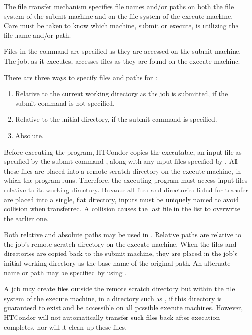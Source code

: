 

The file transfer mechanism specifies file names and/or paths on
both the file system of the submit machine and on the
file system of the execute machine.
Care must be taken to know which machine, submit or execute,
is utilizing the file name and/or path. 

Files in the  command
are specified as they are accessed on the submit machine.
The job, as it executes, accesses files as they are
found on the execute machine.

There are three ways to specify files and paths
for :
\begin{enumerate}
\item Relative to the current working directory as the job is submitted,
if the submit command  is not specified.
\item Relative to the initial directory, if the submit command 
 is specified.
\item Absolute.
\end{enumerate}

Before executing the program, HTCondor copies the
executable, an input file as specified
by the submit command ,
along with any input files specified 
by .
All these files are placed into
a remote scratch directory on the execute machine,
in which the program runs.
Therefore,
the executing program must access input files relative to its
working directory.
Because all files and directories listed for transfer are placed into a single,
flat directory,
inputs must be uniquely named to
avoid collision when transferred.
A collision causes the last file in the list to
overwrite the earlier one.

Both relative and absolute paths may be used in
.  Relative paths are relative to
the job's remote scratch directory on the execute machine.
When the files and directories are copied back to the submit machine, they
are placed in the job's initial working directory as the base name of
the original path.  An alternate name or path may be specified by using
.

A job may create files outside the remote scratch directory
but within the file system of the execute machine,
in a directory such as ,
if this directory is guaranteed to exist and be
accessible on all possible execute machines.
However,
HTCondor will not automatically
transfer such files back after execution completes, nor will it clean
up these files.

